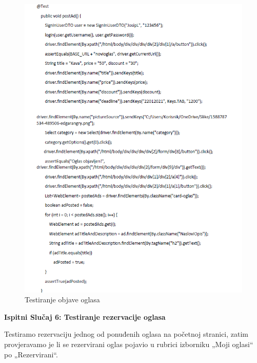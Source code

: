 			\begin{figure}[H]
				\includegraphics[scale=1.1]{slike/sel5.PNG} %
				\centering
				\caption{Testiranje objave oglasa}
				\label{fig:sel5}
			\end{figure}
			
			
				\textbf{Ispitni Slučaj 6: Testiranje rezervacije oglasa}
			
			Testiramo rezervaciju jednog od ponuđenih oglasa na početnoj stranici, zatim provjeravamo je li se rezervirani oglas pojavio u rubrici izborniku „Moji oglasi“ po „Rezervirani“.
			

